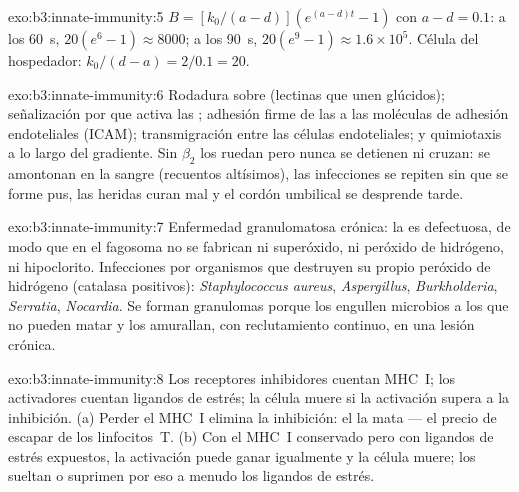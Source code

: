 \begin{solution}{exo:b3:innate-immunity:5}
$B = [k_{0}/(a-d)](e^{(a-d)t} - 1)$ con $a - d = 0.1$: a los \qty{60}{s},
$20(e^{6} - 1) \approx 8000$; a los \qty{90}{s}, $20(e^{9} - 1) \approx
1.6\times 10^{5}$. Célula del hospedador: $k_{0}/(d - a) = 2/0.1 = 20$.
\end{solution}

\begin{solution}{exo:b3:innate-immunity:6}
Rodadura sobre  (lectinas que unen glúcidos); señalización por
 que activa las ; adhesión firme de las  a
las moléculas de adhesión endoteliales (ICAM); transmigración entre las
células endoteliales; y quimiotaxis a lo largo del gradiente. Sin
 $\beta_{2}$ los  ruedan pero nunca se detienen ni
cruzan: se amontonan en la sangre (recuentos altísimos), las infecciones
se repiten sin que se forme pus, las heridas curan mal y el cordón
umbilical se desprende tarde.
\end{solution}

\begin{solution}{exo:b3:innate-immunity:7}
Enfermedad granulomatosa crónica: la  es defectuosa, de modo
que en el fagosoma no se fabrican ni superóxido, ni peróxido de
hidrógeno, ni hipoclorito. Infecciones por organismos que destruyen su
propio peróxido de hidrógeno (catalasa positivos): \emph{Staphylococcus
aureus}, \emph{Aspergillus}, \emph{Burkholderia}, \emph{Serratia},
\emph{Nocardia}. Se forman granulomas porque los  engullen
microbios a los que no pueden matar y los amurallan, con reclutamiento
continuo, en una lesión crónica.
\end{solution}

\begin{solution}{exo:b3:innate-immunity:8}
Los receptores inhibidores cuentan MHC~I; los activadores cuentan
ligandos de estrés; la célula muere si la activación supera a la
inhibición. (a) Perder el MHC~I elimina la inhibición: el  la mata --- el precio de escapar de los linfocitos~T.
(b) Con el MHC~I conservado pero con ligandos de estrés expuestos, la
activación puede ganar igualmente y la célula muere; los  sueltan
o suprimen por eso a menudo los ligandos de estrés.
\end{solution}

